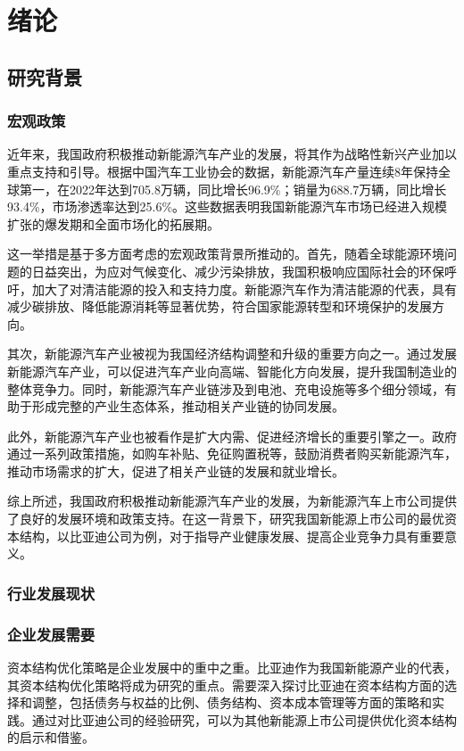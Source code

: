 \chapter{绪论}
\section{研究背景}
\subsection{宏观政策}
近年来，我国政府积极推动新能源汽车产业的发展，将其作为战略性新兴产业加以重点支持和引导。根据中国汽车工业协会的数据，新能源汽车产量连续8年保持全球第一，在2022年达到705.8万辆，同比增长96.9\%；销量为688.7万辆，同比增长93.4\%，市场渗透率达到25.6\%。这些数据表明我国新能源汽车市场已经进入规模扩张的爆发期和全面市场化的拓展期。

这一举措是基于多方面考虑的宏观政策背景所推动的。首先，随着全球能源环境问题的日益突出，为应对气候变化、减少污染排放，我国积极响应国际社会的环保呼吁，加大了对清洁能源的投入和支持力度。新能源汽车作为清洁能源的代表，具有减少碳排放、降低能源消耗等显著优势，符合国家能源转型和环境保护的发展方向。

其次，新能源汽车产业被视为我国经济结构调整和升级的重要方向之一。通过发展新能源汽车产业，可以促进汽车产业向高端、智能化方向发展，提升我国制造业的整体竞争力。同时，新能源汽车产业链涉及到电池、充电设施等多个细分领域，有助于形成完整的产业生态体系，推动相关产业链的协同发展。

此外，新能源汽车产业也被看作是扩大内需、促进经济增长的重要引擎之一。政府通过一系列政策措施，如购车补贴、免征购置税等，鼓励消费者购买新能源汽车，推动市场需求的扩大，促进了相关产业链的发展和就业增长。

综上所述，我国政府积极推动新能源汽车产业的发展，为新能源汽车上市公司提供了良好的发展环境和政策支持。在这一背景下，研究我国新能源上市公司的最优资本结构，以比亚迪公司为例，对于指导产业健康发展、提高企业竞争力具有重要意义。

\subsection{行业发展现状}

\subsection{企业发展需要}
资本结构优化策略是企业发展中的重中之重。比亚迪作为我国新能源产业的代表，其资本结构优化策略将成为研究的重点。需要深入探讨比亚迪在资本结构方面的选择和调整，包括债务与权益的比例、债务结构、资本成本管理等方面的策略和实践。通过对比亚迪公司的经验研究，可以为其他新能源上市公司提供优化资本结构的启示和借鉴。

